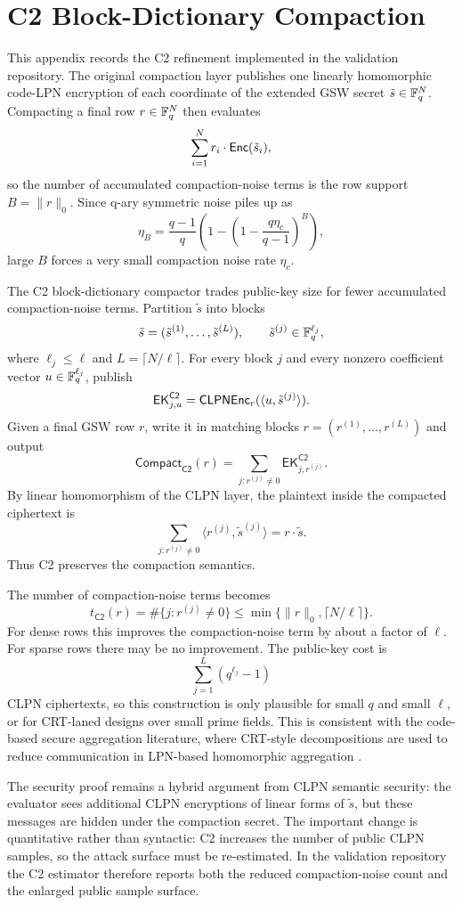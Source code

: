 \section{C2 Block-Dictionary Compaction}
\label{app:c2-block-dictionary}

This appendix records the C2 refinement implemented in the validation repository.  The original compaction layer publishes one linearly homomorphic code-LPN encryption of each coordinate of the extended GSW secret $\tilde{s}\in\mathbb{F}_q^N$.  Compacting a final row $r\in\mathbb{F}_q^N$ then evaluates
\[
  \sum_{i=1}^N r_i \cdot \mathsf{Enc}(\tilde{s}_i),
\]
so the number of accumulated compaction-noise terms is the row support $B=\|r\|_0$.  Since q-ary symmetric noise piles up as
\[
  \eta_B = \frac{q-1}{q}\left(1-\left(1-\frac{q\eta_c}{q-1}\right)^B\right),
\]
large $B$ forces a very small compaction noise rate $\eta_c$.

The C2 block-dictionary compactor trades public-key size for fewer accumulated compaction-noise terms.  Partition $\tilde{s}$ into blocks
\[
  \tilde{s}=(\tilde{s}^{(1)},\ldots,\tilde{s}^{(L)}),
  \qquad \tilde{s}^{(j)}\in\mathbb{F}_q^{\ell_j},
\]
where $\ell_j\leq \ell$ and $L=\lceil N/\ell\rceil$.  For every block $j$ and every nonzero coefficient vector $u\in\mathbb{F}_q^{\ell_j}$, publish
\[
  \mathsf{EK}^{\mathsf{C2}}_{j,u}=\mathsf{CLPN}\mathsf{Enc}_r(\langle u,\tilde{s}^{(j)}\rangle).
\]
Given a final GSW row $r$, write it in matching blocks $r=(r^{(1)},\ldots,r^{(L)})$ and output
\[
  \mathsf{Compact}_{\mathsf{C2}}(r)
  =\sum_{j:r^{(j)}\neq 0}\mathsf{EK}^{\mathsf{C2}}_{j,r^{(j)}}.
\]
By linear homomorphism of the CLPN layer, the plaintext inside the compacted ciphertext is
\[
  \sum_{j:r^{(j)}\neq 0}\langle r^{(j)},\tilde{s}^{(j)}\rangle
  =r\cdot\tilde{s}.
\]
Thus C2 preserves the compaction semantics.

The number of compaction-noise terms becomes
\[
  t_{\mathsf{C2}}(r)=\#\{j:r^{(j)}\neq 0\}
  \leq \min\{\|r\|_0,\lceil N/\ell\rceil\}.
\]
For dense rows this improves the compaction-noise term by about a factor of $\ell$.  For sparse rows there may be no improvement.  The public-key cost is
\[
  \sum_{j=1}^L(q^{\ell_j}-1)
\]
CLPN ciphertexts, so this construction is only plausible for small $q$ and small $\ell$, or for CRT-laned designs over small prime fields.  This is consistent with the code-based secure aggregation literature, where CRT-style decompositions are used to reduce communication in LPN-based homomorphic aggregation \cite{BitzerEggerLiuWachterZeh2026}.

The security proof remains a hybrid argument from CLPN semantic security: the evaluator sees additional CLPN encryptions of linear forms of $\tilde{s}$, but these messages are hidden under the compaction secret.  The important change is quantitative rather than syntactic: C2 increases the number of public CLPN samples, so the attack surface must be re-estimated.  In the validation repository the C2 estimator therefore reports both the reduced compaction-noise count and the enlarged public sample surface.

